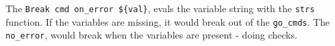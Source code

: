The \texttt{Break\ cmd\ on\_error\ \$\{val\}}, evals the variable string
with the \texttt{strs} function. If the variables are missing, it would
break out of the \texttt{go\_cmds}. The \texttt{no\_error}, would break
when the variables are present - doing checks.
